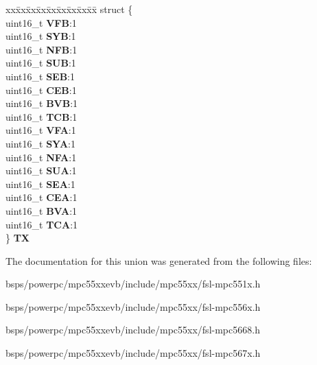 \begin{DoxyCompactItemize}
\begin{tabbing}
\end{tabbing}\item 
\mbox{\label{unionuS__STSTUS_a6fd3f69855fb9f280d5522aeb3338c19}} 
\begin{tabbing}
xx\=xx\=xx\=xx\=xx\=xx\=xx\=xx\=xx\=\kill
struct \{\\
\>uint16\_t {\bfseries VFB}:1\\
\>uint16\_t {\bfseries SYB}:1\\
\>uint16\_t {\bfseries NFB}:1\\
\>uint16\_t {\bfseries SUB}:1\\
\>uint16\_t {\bfseries SEB}:1\\
\>uint16\_t {\bfseries CEB}:1\\
\>uint16\_t {\bfseries BVB}:1\\
\>uint16\_t {\bfseries TCB}:1\\
\>uint16\_t {\bfseries VFA}:1\\
\>uint16\_t {\bfseries SYA}:1\\
\>uint16\_t {\bfseries NFA}:1\\
\>uint16\_t {\bfseries SUA}:1\\
\>uint16\_t {\bfseries SEA}:1\\
\>uint16\_t {\bfseries CEA}:1\\
\>uint16\_t {\bfseries BVA}:1\\
\>uint16\_t {\bfseries TCA}:1\\
\} {\bfseries TX}\\

\end{tabbing}\end{DoxyCompactItemize}


The documentation for this union was generated from the following files\+:\begin{DoxyCompactItemize}
\item 
bsps/powerpc/mpc55xxevb/include/mpc55xx/fsl-\/mpc551x.\+h\item 
bsps/powerpc/mpc55xxevb/include/mpc55xx/fsl-\/mpc556x.\+h\item 
bsps/powerpc/mpc55xxevb/include/mpc55xx/fsl-\/mpc5668.\+h\item 
bsps/powerpc/mpc55xxevb/include/mpc55xx/fsl-\/mpc567x.\+h\end{DoxyCompactItemize}
